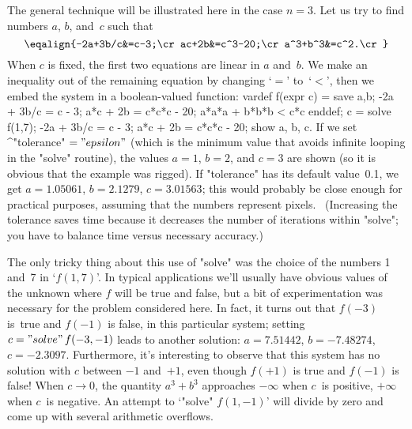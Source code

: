The general technique will be illustrated here in the case $n=3$.
Let us try to find numbers $a$, $b$, and~$c$ such that
$$\eqalign{-2a+3b/c&=c-3;\cr
  ac+2b&=c^3-20;\cr
  a^3+b^3&=c^2.\cr}$$
When $c$ is fixed, the first two equations are linear in $a$ and~$b$.
We make an inequality out of the remaining equation by changing `$=$'
to~`$<$', then we embed the system in a boolean-valued function:
\begintt
vardef f(expr c) = save a,b;
 -2a + 3b/c = c - 3;
 a*c + 2b = c*c*c - 20;
 a*a*a + b*b*b < c*c enddef;
c = solve f(1,7);
-2a + 3b/c = c - 3;
a*c + 2b = c*c*c - 20;
show a, b, c.
\endtt
If we set ^"tolerance"$\null="epsilon"$ (which is the minimum value
that avoids infinite looping in the "solve" routine), the values
$a=1$, $b=2$, and $c=3$ are shown (so it is obvious that the example
was rigged). If "tolerance" has its default value~0.1, we get
$a=1.05061$, $b=2.1279$, $c=3.01563$; this would probably be close
enough for practical purposes, assuming that the numbers represent
pixels. \ (Increasing the tolerance saves time because it
decreases the number of iterations within "solve"; you have to
balance time versus necessary accuracy.)

The only tricky thing about this use of "solve" was the choice of the
numbers 1 and~7 in `$f(1,7)$'. In typical applications we'll usually have
obvious values of the unknown where $f$ will be true and false,
but a bit of experimentation was necessary for the problem considered
here. In fact,
it turns out that $f(-3)$ is~true and $f(-1)$ is false, in this
particular system; setting $c="solve"\,f(-3,-1)$ leads to
another solution: $a=7.51442$, $b=-7.48274$, $c=-2.3097$. Furthermore,
it's interesting to observe that this system has no solution with
$c$ between $-1$ and~$+1$, even though $f(+1)$ is true and
$f(-1)$ is false! When $c\rightarrow0$, the quantity $a^3+b^3$
approaches $-\infty$ when $c$~is positive, $+\infty$ when $c$~is
negative. An attempt to `"solve" $f(1,-1)$' will divide by zero and
come up with several arithmetic overflows.

